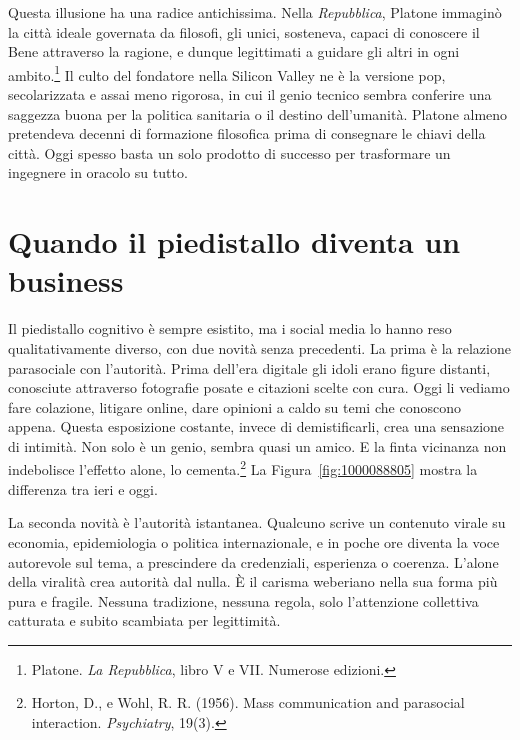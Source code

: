 Questa illusione ha una radice antichissima. Nella \textit{Repubblica}, Platone immagin\`{o} la citt\`{a} ideale governata da filosofi, gli unici, sosteneva, capaci di conoscere il Bene attraverso la ragione, e dunque legittimati a guidare gli altri in ogni ambito.\footnote{Platone. \textit{La Repubblica}, libro V e VII. Numerose edizioni.} Il culto del fondatore nella Silicon Valley ne \`{e} la versione pop, secolarizzata e assai meno rigorosa, in cui il genio tecnico sembra conferire una saggezza buona per la politica sanitaria o il destino dell'umanit\`{a}. Platone almeno pretendeva decenni di formazione filosofica prima di consegnare le chiavi della citt\`{a}. Oggi spesso basta un solo prodotto di successo per trasformare un ingegnere in oracolo su tutto.



\section{Quando il piedistallo diventa un business}

Il piedistallo cognitivo \`{e} sempre esistito, ma i social media lo hanno reso qualitativamente diverso, con due novit\`{a} senza precedenti. La prima \`{e} la relazione parasociale con l'autorit\`{a}. Prima dell'era digitale gli idoli erano figure distanti, conosciute attraverso fotografie posate e citazioni scelte con cura. Oggi li vediamo fare colazione, litigare online, dare opinioni a caldo su temi che conoscono appena. Questa esposizione costante, invece di demistificarli, crea una sensazione di intimit\`{a}. Non solo \`{e} un genio, sembra quasi un amico. E la finta vicinanza non indebolisce l'effetto alone, lo cementa.\footnote{Horton, D., e Wohl, R. R. (1956). Mass communication and parasocial interaction. \textit{Psychiatry}, 19(3).} La Figura~\ref{fig:1000088805} mostra la differenza tra ieri e oggi.


La seconda novit\`{a} \`{e} l'autorit\`{a} istantanea. Qualcuno scrive un contenuto virale su economia, epidemiologia o politica internazionale, e in poche ore diventa la voce autorevole sul tema, a prescindere da credenziali, esperienza o coerenza. L'alone della viralit\`{a} crea autorit\`{a} dal nulla. \`{E} il carisma weberiano nella sua forma pi\`{u} pura e fragile. Nessuna tradizione, nessuna regola, solo l'attenzione collettiva catturata e subito scambiata per legittimit\`{a}.

